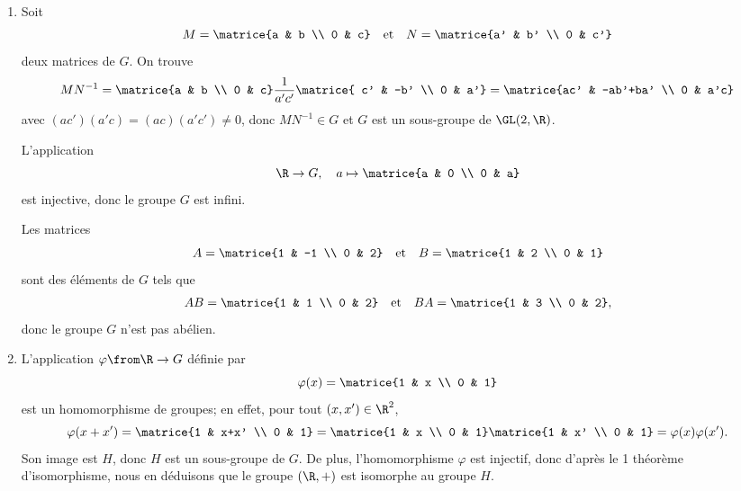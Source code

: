 \begin{enumerate}
  \item
    Soit
    \[
      M = \matrice{a & b \\ 0 & c}
      \quad\text{et}\quad
      N = \matrice{a' & b' \\ 0 & c'}
    \]
    deux matrices de $G$. On trouve
    \[
      MN^ {-1} = \matrice{a & b \\ 0 & c}
                  \dfrac{1}{a'c'} \matrice{ c' & -b' \\ 0 & a'}
               = \matrice{ac' & -ab'+ba' \\ 0 & a'c}
    \]
    avec $(ac')(a'c) = (ac)(a'c')\neq 0$, donc $MN^{-1}\in G$
    et $G$ est un sous-groupe de $\GL(2,\R)$.

    L'application
    \[
      \R\to G,\quad a\mapsto\matrice{a & 0 \\ 0 & a}
    \]
    est injective, donc le groupe $G$ est infini.

    Les matrices
    \[
      A = \matrice{1 & -1 \\ 0 & 2}
      \quad\text{et}\quad
      B = \matrice{1 & 2 \\ 0 & 1}
    \]
    sont des éléments de $G$ tels que
    \begin{gather*}
      AB = \matrice{1 & 1 \\ 0 & 2}
      \quad\text{et}\quad
      BA = \matrice{1 & 3 \\ 0 & 2},
    \end{gather*}
    donc le groupe $G$ n'est pas abélien.

  \item
    L'application $\varphi\from \R \to G$ définie par
    \[
      \varphi(x) = \matrice{1 & x \\ 0 & 1}
    \]
    est un homomorphisme de groupes; en effet, pour tout $(x,x')\in\R^2$,
    \[
      \varphi(x+x')
      = \matrice{1 & x+x' \\ 0 & 1}
      = \matrice{1 & x \\ 0 & 1}\matrice{1 & x' \\ 0 & 1}
      = \varphi(x)\varphi(x').
    \]
    Son image est $H$, donc $H$ est un sous-groupe de $G$.  De plus,
    l'homomorphisme $\varphi$ est injectif, donc d'après le 1 théorème
    d'isomorphisme, nous en déduisons que le groupe $(\R,+)$ est isomorphe au
    groupe $H$.


\end{enumerate}
